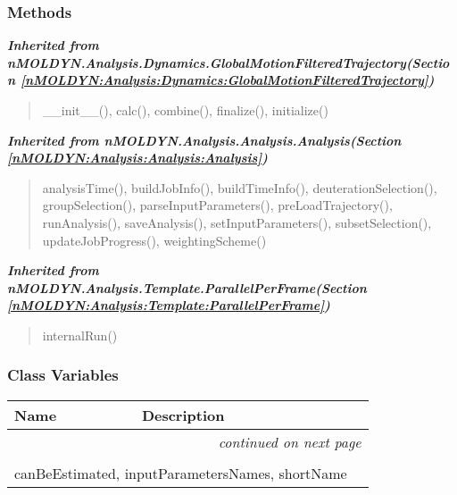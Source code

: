 
  \subsubsection{Methods}


\large{\textbf{\textit{Inherited from nMOLDYN.Analysis.Dynamics.GlobalMotionFilteredTrajectory\textit{(Section \ref{nMOLDYN:Analysis:Dynamics:GlobalMotionFilteredTrajectory})}}}}

\begin{quote}
\_\_init\_\_(), calc(), combine(), finalize(), initialize()
\end{quote}

\large{\textbf{\textit{Inherited from nMOLDYN.Analysis.Analysis.Analysis\textit{(Section \ref{nMOLDYN:Analysis:Analysis:Analysis})}}}}

\begin{quote}
analysisTime(), buildJobInfo(), buildTimeInfo(), deuterationSelection(), groupSelection(), parseInputParameters(), preLoadTrajectory(), runAnalysis(), saveAnalysis(), setInputParameters(), subsetSelection(), updateJobProgress(), weightingScheme()
\end{quote}

\large{\textbf{\textit{Inherited from nMOLDYN.Analysis.Template.ParallelPerFrame\textit{(Section \ref{nMOLDYN:Analysis:Template:ParallelPerFrame})}}}}

\begin{quote}
internalRun()
\end{quote}


  \subsubsection{Class Variables}

    \vspace{-1cm}
\hspace{\varindent}\begin{longtable}{|p{\varnamewidth}|p{\vardescrwidth}|l}
\cline{1-2}
\cline{1-2} \centering \textbf{Name} & \centering \textbf{Description}& \\
\cline{1-2}
\endhead\cline{1-2}\multicolumn{3}{r}{\small\textit{continued on next page}}\\\endfoot\cline{1-2}
\endlastfoot\multicolumn{2}{|l|}{\textit{Inherited from nMOLDYN.Analysis.Dynamics.GlobalMotionFilteredTrajectory \textit{(Section \ref{nMOLDYN:Analysis:Dynamics:GlobalMotionFilteredTrajectory})}}}\\
\multicolumn{2}{|p{\varwidth}|}{\raggedright canBeEstimated, inputParametersNames, shortName}\\
\cline{1-2}
\end{longtable}

